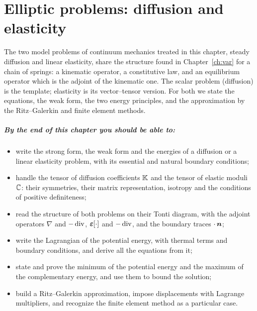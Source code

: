 \chapter{Elliptic problems: diffusion and elasticity}\label{ch:elliptic}

The two model problems of continuum mechanics treated in this chapter, steady
diffusion and linear elasticity, share the structure found in
Chapter~\ref{ch:var} for a chain of springs: a kinematic operator, a
constitutive law, and an equilibrium operator which is the adjoint of the
kinematic one. The scalar problem (diffusion) is the template; elasticity is
its vector--tensor version. For both we state the equations, the weak form,
the two energy principles, and the approximation by the Ritz--Galerkin and
finite element methods.

\paragraph{By the end of this chapter you should be able to:}
\begin{itemize}
  \item write the strong form, the weak form and the energies of a diffusion
  or a linear elasticity problem, with its essential and natural boundary
  conditions;
  \item handle the tensor of diffusion coefficients $\mathbb{K}$ and the tensor of
  elastic moduli $\mathbb{C}$: their symmetries, their matrix representation,
  isotropy and the conditions of positive definiteness;
  \item read the structure of both problems on their Tonti diagram, with the
  adjoint operators $\nabla$ and $-\operatorname{div}$, $\bm{\varepsilon}[\cdot]$ and $-\operatorname{div}$, and the
  boundary traces $\cdot\,\bm{n}$;
  \item write the Lagrangian of the potential energy, with thermal terms and
  boundary conditions, and derive all the equations from it;
  \item state and prove the minimum of the potential energy and the maximum
  of the complementary energy, and use them to bound the solution;
  \item build a Ritz--Galerkin approximation, impose displacements with
  Lagrange multipliers, and recognize the finite element method as a
  particular case.
\end{itemize}

